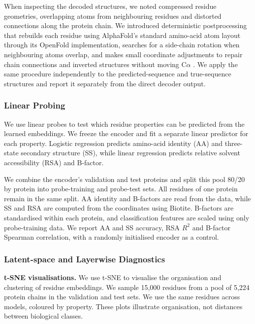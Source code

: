 When inspecting the decoded structures, we noted compressed residue geometries, overlapping atoms from neighbouring residues and distorted connections along the protein chain. We introduced deterministic postprocessing that rebuilds each residue using AlphaFold's standard amino-acid atom layout through its OpenFold implementation, searches for a side-chain rotation when neighbouring atoms overlap, and makes small coordinate adjustments to repair chain connections and inverted structures without moving C$\alpha$ \citep{jumper2021,ahdritz2024openfold}. We apply the same procedure independently to the predicted-sequence and true-sequence structures and report it separately from the direct decoder output.

\subsubsection{Linear Probing}

We use linear probes to test which residue properties can be predicted from the learned embeddings. We freeze the encoder and fit a separate linear predictor for each property. Logistic regression predicts amino-acid identity (AA) and three-state secondary structure (SS), while linear regression predicts relative solvent accessibility (RSA) and B-factor.

We combine the encoder's validation and test proteins and split this pool 80/20 by protein into probe-training and probe-test sets. All residues of one protein remain in the same split. AA identity and B-factors are read from the data, while SS and RSA are computed from the coordinates using Biotite. B-factors are standardised within each protein, and classification features are scaled using only probe-training data. We report AA and SS accuracy, RSA $R^2$ and B-factor Spearman correlation, with a randomly initialised encoder as a control.

\subsubsection{Latent-space and Layerwise Diagnostics}


\textbf{t-SNE visualisations.} We use t-SNE to visualise the organisation and clustering of residue embeddings.
We sample 15,000 residues from a pool of 5,224 protein chains in the validation and test sets. We use the same residues across models, coloured by property.
These plots illustrate organisation, not distances between biological classes.


